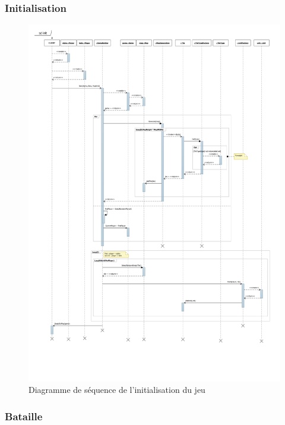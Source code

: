 \subsubsection{Initialisation}

\begin{figure}[h]
  \centering
  \includegraphics[width=13cm]{schemas/sd_init.png}
  \caption{Diagramme de séquence de l'initialisation du jeu}
  \label{sd_init}
\end{figure}

\subsubsection{Bataille}

